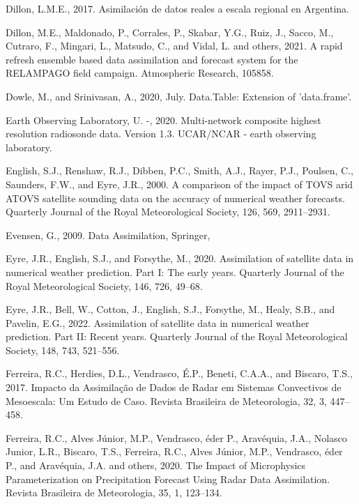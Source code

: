 \documentclass[12pt,oneside,a4paper]{reedthesis}
\begin{document}
\leavevmode\hypertarget{ref-dillon2017}{}%
Dillon, L.M.E., 2017. Asimilación de datos reales a escala regional en Argentina.

\leavevmode\hypertarget{ref-dillon2021}{}%
Dillon, M.E., Maldonado, P., Corrales, P., Skabar, Y.G., Ruiz, J., Sacco, M., Cutraro, F., Mingari, L., Matsudo, C., and Vidal, L. and others, 2021. A rapid refresh ensemble based data assimilation and forecast system for the RELAMPAGO field campaign. Atmospheric Research, 105858.

\leavevmode\hypertarget{ref-dowle2020}{}%
Dowle, M., and Srinivasan, A., 2020, July. Data.Table: Extension of 'data.frame'.

\leavevmode\hypertarget{ref-sondeos}{}%
Earth Observing Laboratory, U. -, 2020. Multi-network composite highest resolution radiosonde data. Version 1.3. UCAR/NCAR - earth observing laboratory.

\leavevmode\hypertarget{ref-english2000}{}%
English, S.J., Renshaw, R.J., Dibben, P.C., Smith, A.J., Rayer, P.J., Poulsen, C., Saunders, F.W., and Eyre, J.R., 2000. A comparison of the impact of TOVS arid ATOVS satellite sounding data on the accuracy of numerical weather forecasts. Quarterly Journal of the Royal Meteorological Society, 126, 569, 2911--2931.

\leavevmode\hypertarget{ref-evensen2009}{}%
Evensen, G., 2009. Data Assimilation, Springer,

\leavevmode\hypertarget{ref-eyre2020}{}%
Eyre, J.R., English, S.J., and Forsythe, M., 2020. Assimilation of satellite data in numerical weather prediction. Part I: The early years. Quarterly Journal of the Royal Meteorological Society, 146, 726, 49--68.

\leavevmode\hypertarget{ref-eyre2022}{}%
Eyre, J.R., Bell, W., Cotton, J., English, S.J., Forsythe, M., Healy, S.B., and Pavelin, E.G., 2022. Assimilation of satellite data in numerical weather prediction. Part II: Recent years. Quarterly Journal of the Royal Meteorological Society, 148, 743, 521--556.

\leavevmode\hypertarget{ref-ferreira2017}{}%
Ferreira, R.C., Herdies, D.L., Vendrasco, É.P., Beneti, C.A.A., and Biscaro, T.S., 2017. Impacto da Assimilação de Dados de Radar em Sistemas Convectivos de Mesoescala: Um Estudo de Caso. Revista Brasileira de Meteorologia, 32, 3, 447--458.

\leavevmode\hypertarget{ref-ferreira2020}{}%
Ferreira, R.C., Alves Júnior, M.P., Vendrasco, éder P., Aravéquia, J.A., Nolasco Junior, L.R., Biscaro, T.S., Ferreira, R.C., Alves Júnior, M.P., Vendrasco, éder P., and Aravéquia, J.A. and others, 2020. The Impact of Microphysics Parameterization on Precipitation Forecast Using Radar Data Assimilation. Revista Brasileira de Meteorologia, 35, 1, 123--134.
\end{document}

